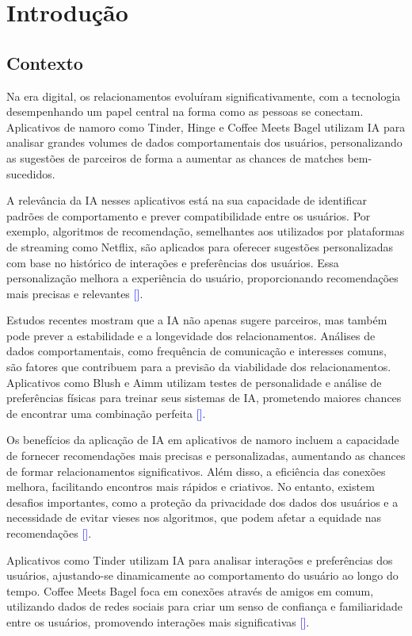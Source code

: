\section{Introdução}%
    \subsection{Contexto}
Na era digital, os relacionamentos evoluíram significativamente, com a tecnologia desempenhando um papel central na forma como as pessoas se conectam. Aplicativos de namoro como Tinder, Hinge e Coffee Meets Bagel utilizam IA para analisar grandes volumes de dados comportamentais dos usuários, personalizando as sugestões de parceiros de forma a aumentar as chances de matches bem-sucedidos.

A relevância da IA nesses aplicativos está na sua capacidade de identificar padrões de comportamento e prever compatibilidade entre os usuários. Por exemplo, algoritmos de recomendação, semelhantes aos utilizados por plataformas de streaming como Netflix, são aplicados para oferecer sugestões personalizadas com base no histórico de interações e preferências dos usuários. Essa personalização melhora a experiência do usuário, proporcionando recomendações mais precisas e relevantes \textcolor{blue}{[\cite{Bonilla2023}]}.

Estudos recentes mostram que a IA não apenas sugere parceiros, mas também pode prever a estabilidade e a longevidade dos relacionamentos. Análises de dados comportamentais, como frequência de comunicação e interesses comuns, são fatores que contribuem para a previsão da viabilidade dos relacionamentos. Aplicativos como Blush e Aimm utilizam testes de personalidade e análise de preferências físicas para treinar seus sistemas de IA, prometendo maiores chances de encontrar uma combinação perfeita \textcolor{blue}{[\cite{Finkel2012}]}.

Os benefícios da aplicação de IA em aplicativos de namoro incluem a capacidade de fornecer recomendações mais precisas e personalizadas, aumentando as chances de formar relacionamentos significativos. Além disso, a eficiência das conexões melhora, facilitando encontros mais rápidos e criativos. No entanto, existem desafios importantes, como a proteção da privacidade dos dados dos usuários e a necessidade de evitar vieses nos algoritmos, que podem afetar a equidade nas recomendações \textcolor{blue}{[\cite{Sharabi2022}]}.

Aplicativos como Tinder utilizam IA para analisar interações e preferências dos usuários, ajustando-se dinamicamente ao comportamento do usuário ao longo do tempo. Coffee Meets Bagel foca em conexões através de amigos em comum, utilizando dados de redes sociais para criar um senso de confiança e familiaridade entre os usuários, promovendo interações mais significativas \textcolor{blue}{[\cite{Saban2024}]}.

